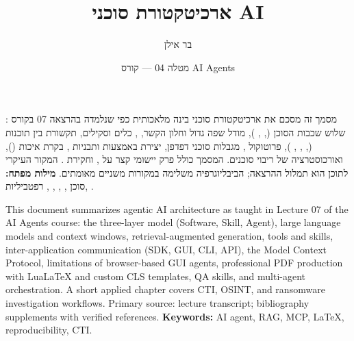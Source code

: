 \documentclass{agentic-ai-template}
\title{ארכיטקטורת סוכני AI}
\author{בר אילן}
\date{מטלה 04 --- קורס AI Agents}
\begin{document}
\maketitlepage

\begin{hebrewabstract}
מסמך זה מסכם את ארכיטקטורת סוכני בינה מלאכותית כפי שנלמדה בהרצאה 07
בקורס : שלוש שכבות הסוכן (, ,
), מודל שפה גדול וחלון הקשר, , כלים וסקילים,
תקשורת בין תוכנות (, , , ),
פרוטוקול , מגבלות סוכני דפדפן, יצירת  באמצעות
 ותבניות , בקרת איכות (),
ואורכוסטרציה של ריבוי סוכנים. המסמך כולל פרק יישומי קצר על
,  וחקירת . המקור העיקרי לתוכן
הוא תמלול ההרצאה; הביבליוגרפיה משלימה במקורות משניים מאומתים.
\textbf{מילות מפתח:} סוכן , , , ,
רפטביליות, .
\end{hebrewabstract}

\begin{englishabstract}
This document summarizes agentic AI architecture as taught in Lecture 07
of the AI Agents course: the three-layer model (Software, Skill, Agent),
large language models and context windows, retrieval-augmented generation,
tools and skills, inter-application communication (SDK, GUI, CLI, API),
the Model Context Protocol, limitations of browser-based GUI agents,
professional PDF production with LuaLaTeX and custom CLS templates,
QA skills, and multi-agent orchestration. A short applied chapter
covers CTI, OSINT, and ransomware investigation workflows. Primary
source: lecture transcript; bibliography supplements with verified references.
\textbf{Keywords:} AI agent, RAG, MCP, LaTeX, reproducibility, CTI.
\end{englishabstract}

\tableofcontents
\listoffigures
\listoftables
\newpage



















\end{document}
